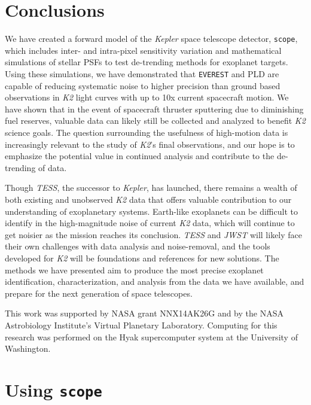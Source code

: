 \documentclass[12pt,preprint]{aastex}
\begin{document}
\section{Conclusions}

We have created a forward model of the \textit{Kepler} space telescope detector, \texttt{scope}, which includes inter- and intra-pixel sensitivity variation and mathematical simulations of stellar PSFs to test de-trending methods for exoplanet targets. Using these simulations, we have demonstrated that \texttt{EVEREST} and PLD are  capable of reducing systematic noise to higher precision than ground based observations in \textit{K2} light curves with up to 10x current spacecraft motion. We have shown that in the event of spacecraft thruster sputtering due to diminishing fuel reserves, valuable data can likely still be collected and analyzed to benefit \textit{K2} science goals. The question surrounding the usefulness of high-motion data is increasingly relevant to the study of \textit{K2}'s final observations, and our hope is to emphasize the potential value in continued analysis and contribute to the de-trending of data.

Though \textit{TESS}, the successor to \textit{Kepler}, has launched, there remains a wealth of both existing and unobserved \textit{K2} data that offers valuable contribution to our understanding of exoplanetary systems. Earth-like exoplanets can be difficult to identify in the high-magnitude noise of current \textit{K2} data, which will continue to get noisier as the mission reaches its conclusion. \textit{TESS} and \textit{JWST} will likely face their own challenges with data analysis and noise-removal, and the tools developed for \textit{K2} will be foundations and references for new solutions. The methods we have presented aim to produce the most precise exoplanet identification, characterization, and analysis from the data we have available, and prepare for the next generation of space telescopes.

This work was supported by NASA grant NNX14AK26G and by the NASA Astrobiology Institute's Virtual Planetary Laboratory. Computing for this research was performed on the Hyak supercomputer system at the University of Washington.

\clearpage



\clearpage
\appendix
\section{Using \texttt{scope}}
\end{document}
